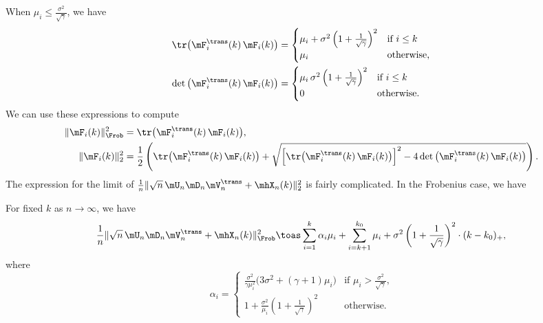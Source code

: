 When $\mu_i \leq \frac{\sigma^2}{\sqrt{\gamma}}$, we have
\begin{align*}
    \tr \big( \mF_i^\trans(k) \, \mF_i(k) \big)
        &=
            \begin{cases}
                \mu_i 
                +
                \sigma^2
                \left(
                    1 + \frac{1}{\sqrt{\gamma}}
                \right)^2
                    &\text{if $i \leq k$} \\
                \mu_i
                    &\text{otherwise,}
            \end{cases} \\
    \det \big( \mF_i^\trans(k) \, \mF_i(k) \big)
        &=
            \begin{cases}
                \mu_i \,
                \sigma^2
                \left(
                    1 + \frac{1}{\sqrt{\gamma}}
                \right)^2
                    &\text{if $i \leq k$} \\
                0
                    &\text{otherwise.}
            \end{cases}
\end{align*}
We can use these expressions to compute
\begin{align*}
    \| \mF_i(k) \|_\Frob^2
        &= \tr \big( \mF_i^\trans(k) \, \mF_i(k) \big), \\
    \| \mF_i(k) \|_2^2
        &= \frac{1}{2}
           \left(
                 \tr \big( \mF_i^\trans(k) \, \mF_i(k) \big)
                 +
                 \sqrt{
                    \left[ 
                        \tr \big( \mF_i^\trans(k) \, \mF_i(k) \big) 
                    \right]^2
                    -
                    4
                    \det \big( \mF_i^\trans(k) \, \mF_i(k) \big) 
                 }
           \right).
\end{align*}
The expression for the limit of 
\(
    \frac{1}{n} 
    \| \sqrt{n} \, \mU_n \mD_n \mV_n^\trans + \mhX_n(k) \|_2^2
\)
is fairly complicated.  In the Frobenius case, we have
\begin{proposition}\label{P:frob-loss-behavior}
    For fixed $k$ as $n \to \infty$, we have
    \[
        \frac{1}{n}
        \| \sqrt{n} \, \mU_n \mD_n \mV_n^\trans + \mhX_n(k) \|_\Frob^2
        \toas
        \sum_{i=1}^{k}
            \alpha_i \mu_i
        +
        \sum_{i=k+1}^{k_0}
            \mu_i
        +
        \sigma^2
        \left(
            1 + \frac{1}{\sqrt{\gamma}}
        \right)^2
        \cdot
        (k - k_0)_+,
    \]
    where
    \[
        \alpha_i 
        =
        \begin{cases}
            \frac{\sigma^2}{\gamma \mu_i^2}
                    \big(
                        3 \sigma^2 + (\gamma+1) \mu_i
                    \big)
                &\text{if $\mu_i > \frac{\sigma^2}{\sqrt{\gamma}}$,} \\
            1 
            + 
            \frac{\sigma^2}{\mu_i}
            \left(
                1
                +
                \frac{1}{\sqrt{\gamma}}
            \right)^2
                &\text{otherwise.}
        \end{cases}
    \]
\end{proposition}

